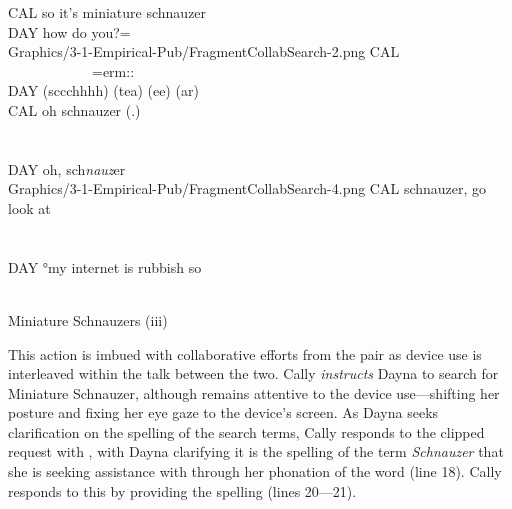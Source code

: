 \begin{revisedsubmission}
\begin{fragfloat*}
    {
    \begin{transcript*}[15]
        \by CAL {so it's miniature schnauzer} \\
        \by DAY {how do you?=} \\
           {Graphics/3-1-Empirical-Pub/FragmentCollabSearch-2.png}
        \by CAL {~~~~~~~~~~~~=erm::} \\
        \by DAY {(sccchhhh) (tea) (ee) (ar)} \\
        \by CAL {oh schnauzer (.)} \\
         \\
         \\
        \by DAY {oh, sch\emph{nauz}er\vspace*{.4cm}} \\
           {Graphics/3-1-Empirical-Pub/FragmentCollabSearch-4.png}
        \by CAL {schnauzer, go look at} \\
         \\
        \\
        \by DAY {°my internet is rubbish so} \\
         \\
    \end{transcript*}
    \caption{Miniature Schnauzers (iii)}\label{frag:empirical pub findings newinfo-iii}
    }
\end{fragfloat*}

This action is imbued with collaborative efforts from the pair as device use is interleaved within the talk between the two.
Cally \textit{instructs} Dayna to search for Miniature Schnauzer, although remains attentive to the device use---shifting her posture and fixing her eye gaze to the device's screen.
As Dayna seeks clarification on the spelling of the search terms, Cally responds to the clipped request  with , with Dayna clarifying it is the spelling of the term \textit{Schnauzer} that she is seeking assistance with through her phonation of the word (line 18).
Cally responds to this by providing the spelling (lines 20---21).


\end{revisedsubmission}
